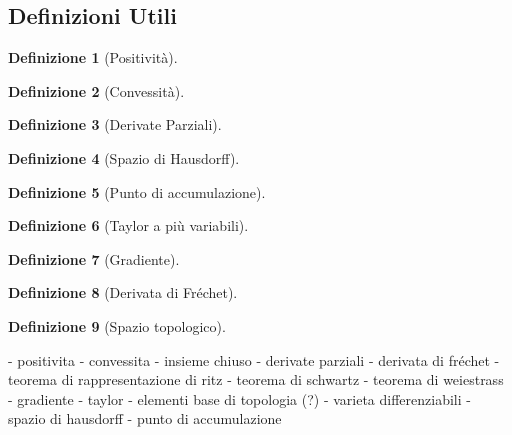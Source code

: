 \documentclass[a4paper, 12pt]{article}
\newtheorem{definition}{Definizione}
\begin{document}
\subsection{Definizioni Utili}
\begin{definition}[Positività]
\end{definition}
\begin{definition}[Convessità]
\end{definition}
\begin{definition}[Derivate Parziali]
\end{definition}
\begin{definition}[Spazio di Hausdorff]
\end{definition}
\begin{definition}[Punto di accumulazione]
\end{definition}
\begin{definition}[Taylor a più variabili]
\end{definition}
\begin{definition}[Gradiente]
\end{definition}
\begin{definition}[Derivata di Fréchet]
\end{definition}
\begin{definition}[Spazio topologico]
\end{definition}

- positivita
- convessita
- insieme chiuso
- derivate parziali
- derivata di fréchet
- teorema di rappresentazione di ritz
- teorema di schwartz
- teorema di weiestrass
- gradiente 
- taylor
- elementi base di topologia (?)
- varieta differenziabili
- spazio di hausdorff
- punto di accumulazione
\end{document}
